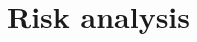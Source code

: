 \documentclass{report}
\begin{document}
	
	
	
	\chapter{Risk analysis}
	
	
	
	\printbibliography
	
\end{document}
